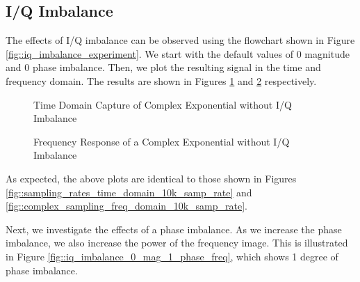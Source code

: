 \documentclass{article}
\begin{document}
\subsection{I/Q Imbalance}

The effects of I/Q imbalance can be observed using the flowchart shown in Figure \ref{fig::iq_imbalance_experiment}. We start with the default values of 0 magnitude and 0 phase imbalance. Then, we plot the resulting signal in the time and frequency domain. The results are shown in Figures \ref{fig::iq_imbalance_0_mag_0_phase_time} and \ref{fig::iq_imbalance_0_mag_0_phase_freq} respectively. 

\begin{figure}[H]
	\centerline{}
	\caption{Time Domain Capture of Complex Exponential without I/Q Imbalance}
	\label{fig::iq_imbalance_0_mag_0_phase_time}
\end{figure}

\begin{figure}[H]
	\centerline{}
	\caption{Frequency Response of a Complex Exponential without I/Q Imbalance}
	\label{fig::iq_imbalance_0_mag_0_phase_freq}
\end{figure}

As expected, the above plots are identical to those shown in Figures \ref{fig::sampling_rates_time_domain_10k_samp_rate} and  \ref{fig::complex_sampling_freq_domain_10k_samp_rate}.

Next, we investigate the effects of a phase imbalance. As we increase the phase imbalance, we also increase the power of the frequency image. This is illustrated in Figure \ref{fig::iq_imbalance_0_mag_1_phase_freq}, which shows 1 degree of phase imbalance.
\end{document}
